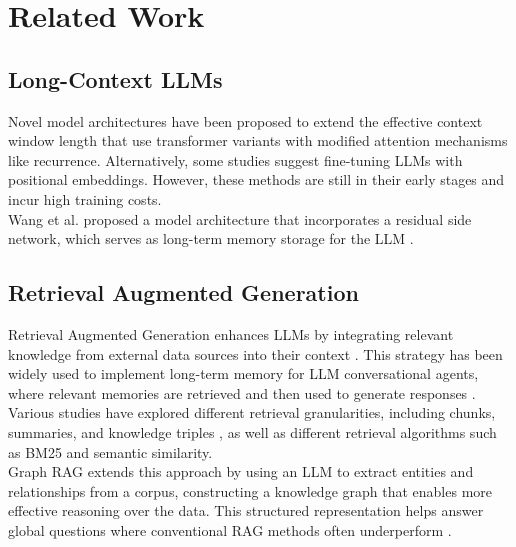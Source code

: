 \cleardoublepage
\chapter{Related Work}
\label{ch:relatedwork}
\label{ch:chapter2}

\section{Long-Context LLMs}

Novel model architectures have been proposed to extend the effective context window length that use transformer variants with modified attention mechanisms like recurrence. Alternatively, some studies suggest fine-tuning LLMs with positional embeddings. However, these methods are still in their early stages and incur high training costs. \\

\noindent Wang et al. proposed a model architecture that incorporates a residual side network, which serves as long-term memory storage for the LLM \cite{wang2023augmentinglanguagemodelslongterm}.

\section{Retrieval Augmented Generation}

Retrieval Augmented Generation enhances LLMs by integrating relevant knowledge from external data sources into their context \cite{lewis2021retrievalaugmentedgenerationknowledgeintensivenlp}. This strategy has been widely used to implement long-term memory for LLM conversational agents, where relevant memories are retrieved and then used to generate responses \cite{zeng2024structuralmemoryllmagents}. \\ 

\noindent Various studies have explored different retrieval granularities, including chunks, summaries, and knowledge triples \cite{zeng2024structuralmemoryllmagents}, as well as different retrieval algorithms such as BM25 and semantic similarity.\\

\noindent Graph RAG extends this approach by using an LLM to extract entities and relationships from a corpus, constructing a knowledge graph that enables more effective reasoning over the data. This structured representation helps answer global questions where conventional RAG methods often underperform \cite{edge2024localglobalgraphrag}.

